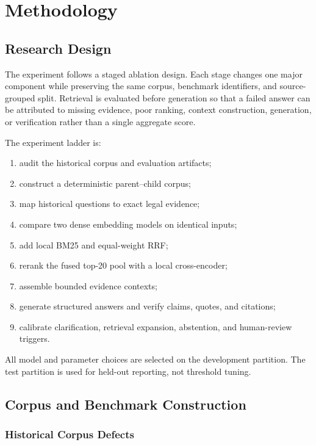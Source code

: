 \chapter{Methodology}
\label{chap:method}

\section{Research Design}

The experiment follows a staged ablation design. Each stage changes one major component while preserving the same corpus, benchmark identifiers, and source-grouped split. Retrieval is evaluated before generation so that a failed answer can be attributed to missing evidence, poor ranking, context construction, generation, or verification rather than a single aggregate score.

The experiment ladder is:

\begin{enumerate}
  \item audit the historical corpus and evaluation artifacts;
  \item construct a deterministic parent--child corpus;
  \item map historical questions to exact legal evidence;
  \item compare two dense embedding models on identical inputs;
  \item add local BM25 and equal-weight \ac{RRF};
  \item rerank the fused top-20 pool with a local cross-encoder;
  \item assemble bounded evidence contexts;
  \item generate structured answers and verify claims, quotes, and citations;
  \item calibrate clarification, retrieval expansion, abstention, and human-review triggers.
\end{enumerate}

All model and parameter choices are selected on the development partition. The test partition is used for held-out reporting, not threshold tuning.

\section{Corpus and Benchmark Construction}

\subsection{Historical Corpus Defects}

